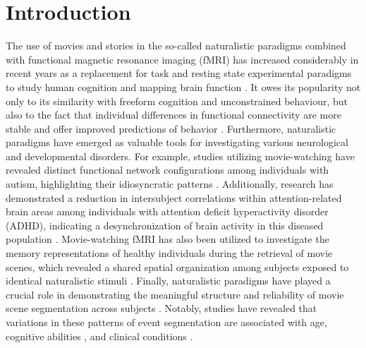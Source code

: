 \section{Introduction}
\label{sec:multi_subject_introduction}

The use of movies and stories in the so-called naturalistic paradigms combined
with functional magnetic resonance imaging (fMRI) has increased considerably in
recent years as a replacement for task and resting state experimental paradigms
to study human cognition and mapping brain function \citep{Finn2021Isittime}. It
owes its popularity not only to its similarity with freeform cognition and
unconstrained behaviour, but also to the fact that individual differences in
functional connectivity are more stable
\citep{Vanderwal2017Individualdifferencesfunctional,
Wang2017Testretestreliability} and offer improved predictions of behavior
\citep{Finn2021Moviewatchingoutperforms}. Furthermore, naturalistic paradigms
have emerged as valuable tools for investigating various neurological and
developmental disorders. For example, studies utilizing movie-watching have
revealed distinct functional network configurations among individuals with
autism, highlighting their idiosyncratic patterns
\citep{Bolton2018BraindynamicsASD,Bolton2020Neuralresponsesautism}.
Additionally, research has demonstrated a reduction in intersubject correlations
within attention-related brain areas among individuals with attention deficit
hyperactivity disorder (ADHD), indicating a desynchronization of brain activity
in this diseased population \citep{Salmi2020ADHDdesynchronizesbrain}.
Movie-watching fMRI has also been utilized to investigate the memory
representations of healthy individuals during the retrieval of movie scenes,
which revealed a shared spatial organization among subjects exposed to identical
naturalistic stimuli \citep{Chen2017Sharedmemoriesreveal}. Finally, naturalistic
paradigms have played a crucial role in demonstrating the meaningful structure
and reliability of movie scene segmentation across subjects
\citep{Raccah2022Acousticfeaturesdrive, Speer2009ReadingStoriesActivates,
Zacks2009Usingmovementintentions}. Notably, studies have revealed that
variations in these patterns of event segmentation are associated with age,
cognitive abilities \citep{Bailey2017Attentionalfocusaffects,
Jafarpour2022Eventsegmentationreveals, Zacks2006Eventunderstandingmemory}, and
clinical conditions \citep{Zalla2004Perceptiondynamicaction}.

